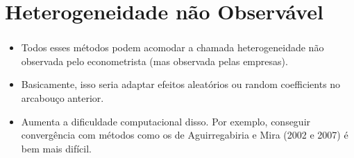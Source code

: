 \documentclass{beamer}
\begin{document}
\section{Heterogeneidade não Observável}
\begin{frame}[fragile]\frametitle{\insertsection}
\begin{itemize}
	\item Todos esses métodos podem acomodar a chamada heterogeneidade não observada pelo econometrista (mas observada pelas empresas).
	\item Basicamente, isso seria adaptar efeitos aleatórios ou random coefficients no arcabouço anterior.
	\item Aumenta a dificuldade computacional disso. Por exemplo, conseguir convergência com métodos como os de Aguirregabiria e Mira (2002 e 2007) é bem mais difícil.
	
\end{itemize}
    


\end{frame}

\begin{comment}
\begin{frame}[allowframebreaks]



\end{frame}

\end{comment}
\end{document}
